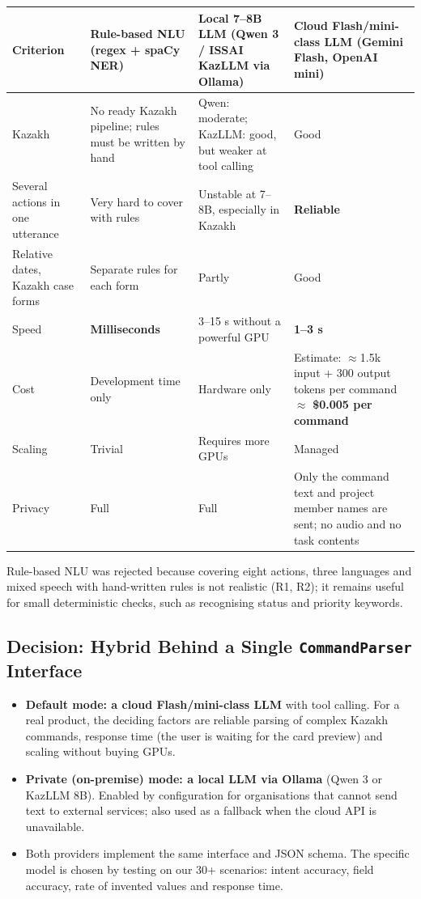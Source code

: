 \documentclass[11pt,a4paper]{article}
\newcommand{\tblstart}{\small\rowcolors{2}{gray!7}{white}}
\newcommand{\code}[1]{\texttt{#1}}
\begin{document}
{\tblstart
\begin{xltabular}{\textwidth}{P{2.9cm} L L L}
\toprule
\textbf{Criterion} & \textbf{Rule-based NLU (regex + spaCy NER)} & \textbf{Local 7--8B LLM (Qwen 3 / ISSAI KazLLM via Ollama)} & \textbf{Cloud Flash/mini-class LLM (Gemini Flash, OpenAI mini)} \\
\midrule
\endhead
Kazakh & No ready Kazakh pipeline; rules must be written by hand & Qwen: moderate; KazLLM: good, but weaker at tool calling & Good \\
Several actions in one utterance & Very hard to cover with rules & Unstable at 7--8B, especially in Kazakh & \textbf{Reliable} \\
Relative dates, Kazakh case forms & Separate rules for each form & Partly & Good \\
Speed & \textbf{Milliseconds} & 3--15 s without a powerful GPU & \textbf{1--3 s} \\
Cost & Development time only & Hardware only & Estimate: $\approx$1.5k input + 300 output tokens per command $\approx$ \textbf{\$0.005 per command} \\
Scaling & Trivial & Requires more GPUs & Managed \\
Privacy & Full & Full & Only the command text and project member names are sent; no audio and no task contents \\
\bottomrule
\end{xltabular}}

Rule-based NLU was rejected because covering eight actions, three languages and mixed speech with hand-written rules is not realistic (R1, R2); it remains useful for small deterministic checks, such as recognising status and priority keywords.

\subsection{Decision: Hybrid Behind a Single \code{CommandParser} Interface}

\begin{itemize}
  \item \textbf{Default mode: a cloud Flash/mini-class LLM} with tool calling. For a real product, the deciding factors are reliable parsing of complex Kazakh commands, response time (the user is waiting for the card preview) and scaling without buying GPUs.
  \item \textbf{Private (on-premise) mode: a local LLM via Ollama} (Qwen 3 or KazLLM 8B). Enabled by configuration for organisations that cannot send text to external services; also used as a fallback when the cloud API is unavailable.
  \item Both providers implement the same interface and JSON schema. The specific model is chosen by testing on our 30+ scenarios: intent accuracy, field accuracy, rate of invented values and response time.
\end{itemize}
\end{document}

